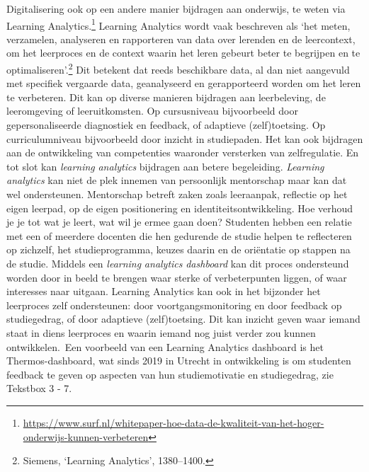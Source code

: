 \documentclass[smallauthor, chapterhaspagenum, nochapterinheader, pagenuminheader,  bigchapnum,medium2, tocpages, garamond, titleinheader]{jote-book}
\begin{document}
	Digitalisering ook op een andere manier bijdragen aan onderwijs, te weten via Learning Analytics.\footnote{\href{https://www.surf.nl/whitepaper-hoe-data-de-kwaliteit-van-het-hoger-onderwijs-kunnen-verbeteren}{https://www.surf.nl/whitepaper-hoe-data-de-kwaliteit-van-het-hoger-onderwijs-kunnen-verbeteren} } Learning Analytics wordt vaak beschreven als ‘het meten, verzamelen, analyseren en rapporteren van data over lerenden en de leercontext, om het leerproces en de context waarin het leren gebeurt beter te begrijpen en te optimaliseren'.\footnote{Siemens, ‘Learning Analytics', 1380--1400. } Dit betekent dat reeds beschikbare data, al dan niet aangevuld met specifiek vergaarde data, geanalyseerd en gerapporteerd worden om het leren te verbeteren. Dit kan op diverse manieren bijdragen aan leerbeleving, de leeromgeving of leeruitkomsten. Op cursusniveau bijvoorbeeld door gepersonaliseerde diagnostiek en feedback, of adaptieve (zelf)toetsing. Op curriculumniveau bijvoorbeeld door inzicht in studiepaden. Het kan ook bijdragen aan de ontwikkeling van competenties waaronder versterken van zelfregulatie. En tot slot kan \emph{learning}\emph{ }\emph{analytics} bijdragen aan betere begeleiding. \emph{Learning }\emph{analytics} kan niet de plek innemen van persoonlijk mentorschap maar kan dat wel ondersteunen. Mentorschap betreft zaken zoals leeraanpak, reflectie op het eigen leerpad, op de eigen positionering en identiteitsontwikkeling. Hoe verhoud je je tot wat je leert, wat wil je ermee gaan doen? Studenten hebben een relatie met een of meerdere docenten die hen gedurende de studie helpen te reflecteren op zichzelf, het studieprogramma, keuzes daarin en de oriëntatie op stappen na de studie. Middels een \emph{l}\emph{earning}\emph{ }\emph{a}\emph{nalytics}\emph{ }\emph{d}\emph{ashboard} kan dit proces ondersteund worden door in beeld te brengen waar sterke of verbeterpunten liggen, of waar interesses naar uitgaan. Learning Analytics kan ook in het bijzonder het leerproces zelf ondersteunen: door voortgangsmonitoring en door feedback op studiegedrag, of door adaptieve (zelf)toetsing. Dit kan inzicht geven waar iemand staat in diens leerproces en waarin iemand nog juist verder zou kunnen ontwikkelen. Een voorbeeld van een Learning Analytics dashboard is het Thermos-dashboard, wat sinds 2019 in Utrecht in ontwikkeling is om studenten feedback te geven op aspecten van hun studiemotivatie en studiegedrag, zie Tekstbox 3 - 7.
\end{document}
